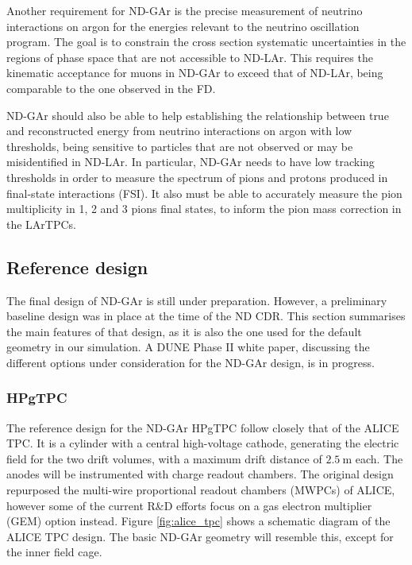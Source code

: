 Another requirement for ND-GAr is the precise measurement of neutrino interactions on argon for the energies relevant to the neutrino oscillation program. The goal is to constrain the cross section systematic uncertainties in the regions of phase space that are not accessible to ND-LAr. This requires the kinematic acceptance for muons in ND-GAr to exceed that of ND-LAr, being comparable to the one observed in the FD.

ND-GAr should also be able to help establishing the relationship between true and reconstructed energy from neutrino interactions on argon with low thresholds, being sensitive to particles that are not observed or may be misidentified in ND-LAr. In particular, ND-GAr needs to have low tracking thresholds in order to measure the spectrum of pions and protons produced in final-state interactions (FSI). It also must be able to accurately measure the pion multiplicity in 1, 2 and 3 pions final states, to inform the pion mass correction in the LArTPCs.

\subsection{Reference design}

The final design of ND-GAr is still under preparation. However, a preliminary baseline design was in place at the time of the ND CDR. This section summarises the main features of that design, as it is also the one used for the default geometry in our simulation. A DUNE Phase II white paper, discussing the different options under consideration for the ND-GAr design, is in progress. 

\subsubsection{HPgTPC}

The reference design for the ND-GAr HPgTPC follow closely that of the ALICE TPC. It is a cylinder with a central high-voltage cathode, generating the electric field for the two drift volumes, with a maximum drift distance of $2.5~\mathrm{m}$ each. The anodes will be instrumented with charge readout chambers. The original design repurposed the multi-wire proportional readout chambers (MWPCs) of ALICE, however some of the current R\&D efforts focus on a gas electron multiplier (GEM) \cite{Sauli1997} option instead. Figure \ref{fig:alice_tpc} shows a schematic diagram of the ALICE TPC design. The basic ND-GAr geometry will resemble this, except for the inner field cage.

